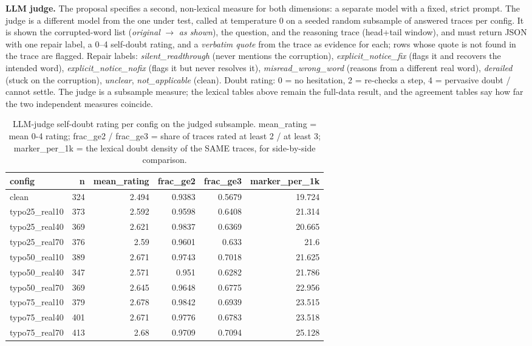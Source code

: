 \documentclass[11pt]{article}
\begin{document}
\noindent\textbf{LLM judge.} The proposal specifies a second,
non-lexical measure for both dimensions: a separate model with a fixed, strict prompt.
The judge is a different model from the one under test, called at temperature 0 on a
seeded random subsample of answered traces per config. It is shown the corrupted-word
list (\emph{original} $\to$ \emph{as shown}), the question, and the reasoning trace
(head+tail window), and must return JSON with one repair label, a 0--4 self-doubt
rating, and a \emph{verbatim quote} from the trace as evidence for each; rows whose
quote is not found in the trace are flagged. Repair labels:
\emph{silent\_readthrough} (never mentions the corruption),
\emph{explicit\_notice\_fix} (flags it and recovers the intended word),
\emph{explicit\_notice\_nofix} (flags it but never resolves it),
\emph{misread\_wrong\_word} (reasons from a different real word),
\emph{derailed} (stuck on the corruption), \emph{unclear}, \emph{not\_applicable} (clean).
Doubt rating: 0 = no hesitation, 2 = re-checks a step, 4 = pervasive doubt / cannot settle.
The judge is a subsample measure; the lexical tables above remain the full-data result,
and the agreement tables say how far the two independent measures coincide.
\medskip

\begin{table}[H]
\centering
\caption{LLM-judge self-doubt rating per config on the judged subsample. mean\_rating = mean 0-4 rating; frac\_ge2 / frac\_ge3 = share of traces rated at least 2 / at least 3; marker\_per\_1k = the lexical doubt density of the SAME traces, for side-by-side comparison.}
\small
\begin{adjustbox}{max width=\textwidth}
\begin{tabular}{lrrrrr}
\toprule
\textbf{config} & \textbf{n} & \textbf{mean\_rating} & \textbf{frac\_ge2} & \textbf{frac\_ge3} & \textbf{marker\_per\_1k} \\
\midrule
clean & 324 & 2.494 & 0.9383 & 0.5679 & 19.724 \\
typo25\_real10 & 373 & 2.592 & 0.9598 & 0.6408 & 21.314 \\
typo25\_real40 & 369 & 2.621 & 0.9837 & 0.6369 & 20.665 \\
typo25\_real70 & 376 & 2.59 & 0.9601 & 0.633 & 21.6 \\
typo50\_real10 & 389 & 2.671 & 0.9743 & 0.7018 & 21.625 \\
typo50\_real40 & 347 & 2.571 & 0.951 & 0.6282 & 21.786 \\
typo50\_real70 & 369 & 2.645 & 0.9648 & 0.6775 & 22.956 \\
typo75\_real10 & 379 & 2.678 & 0.9842 & 0.6939 & 23.515 \\
typo75\_real40 & 401 & 2.671 & 0.9776 & 0.6783 & 23.518 \\
typo75\_real70 & 413 & 2.68 & 0.9709 & 0.7094 & 25.128 \\
\bottomrule
\end{tabular}
\end{adjustbox}
\end{table}
\end{document}
